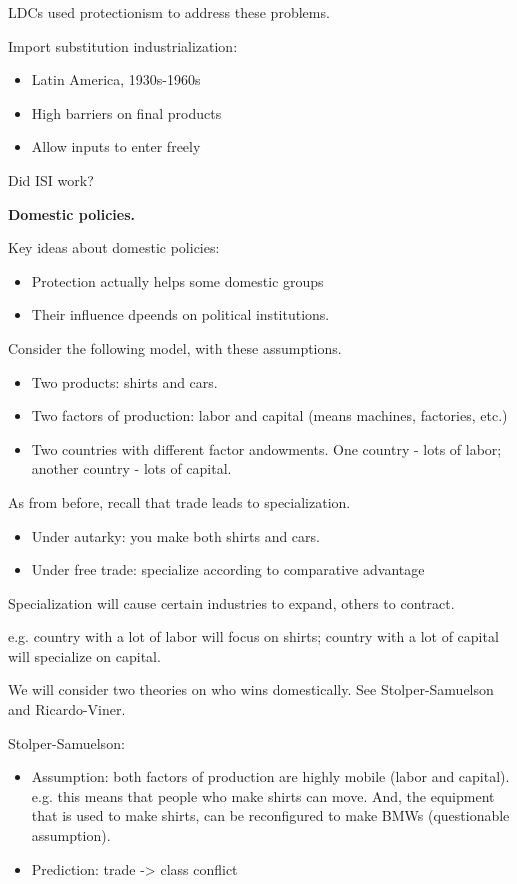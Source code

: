 \documentclass{article}
\begin{document}
LDCs used protectionism to address these problems.

Import substitution industrialization:

\begin{itemize}
  \item Latin America, 1930s-1960s
  \item High barriers on final products
  \item Allow inputs to enter freely
\end{itemize}

Did ISI work?

{\bf Domestic policies.}

Key ideas about domestic policies:
\begin{itemize}
  \item Protection actually helps some domestic groups
  \item Their influence dpeends on political institutions.
\end{itemize}

Consider the following model, with these assumptions.
\begin{itemize}
  \item Two products: shirts and cars.
  \item Two factors of production: labor and capital (means machines, factories, etc.)
  \item Two countries with different factor andowments.  One country - lots of labor; another country - lots of capital.
\end{itemize}

As from before, recall that trade leads to specialization.

\begin{itemize}
  \item Under autarky: you make both shirts and cars.
  \item Under free trade: specialize according to comparative advantage
\end{itemize}

Specialization will cause certain industries to expand, others to contract.

e.g. country with a lot of labor will focus on shirts; country with a lot of capital will specialize on capital.

We will consider two theories on who wins domestically.  See Stolper-Samuelson and Ricardo-Viner.

Stolper-Samuelson:
\begin{itemize}
  \item Assumption: both factors of production are highly mobile (labor and capital).  e.g. this means that people who make shirts can move.  And, the equipment that is used to make shirts, can be reconfigured to make BMWs (questionable assumption).
  \item Prediction: trade -> class conflict 
\end{itemize}
\end{document}
